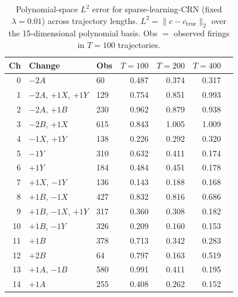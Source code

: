 \begin{table}[htbp]
\centering
\caption{%
  Polynomial-space $L^2$ error for sparse-learning-CRN (fixed $\lambda=0.01$)
  across trajectory lengths.
  $L^2 = \|\hat{{c}} - c_{{\mathrm{{true}}}}\|_2$ over the 15-dimensional
  polynomial basis. Obs $=$ observed firings in $T{=}100$ trajectories.
}
\label{tab:lasso-fixed-lambda}
\begin{tabular}{rllrrrr}
\toprule
\textbf{Ch} & \textbf{Change} & \textbf{Obs} & $T=100$ & $T=200$ & $T=400$ \\
\midrule
0 & $-2A$ & 60 & 0.487 & 0.374 & 0.317 \\
1 & $-2A$, $+1X$, $+1Y$ & 129 & 0.754 & 0.851 & 0.993 \\
2 & $-2A$, $+1B$ & 230 & 0.962 & 0.879 & 0.938 \\
3 & $-2B$, $+1X$ & 615 & 0.843 & 1.005 & 1.009 \\
4 & $-1X$, $+1Y$ & 138 & 0.226 & 0.292 & 0.320 \\
5 & $-1Y$ & 310 & 0.632 & 0.411 & 0.174 \\
6 & $+1Y$ & 184 & 0.484 & 0.451 & 0.178 \\
7 & $+1X$, $-1Y$ & 136 & 0.143 & 0.188 & 0.168 \\
8 & $+1B$, $-1X$ & 427 & 0.832 & 0.816 & 0.686 \\
9 & $+1B$, $-1X$, $+1Y$ & 317 & 0.360 & 0.308 & 0.182 \\
10 & $+1B$, $-1Y$ & 326 & 0.209 & 0.160 & 0.153 \\
11 & $+1B$ & 378 & 0.713 & 0.342 & 0.283 \\
12 & $+2B$ & 64 & 0.797 & 0.163 & 0.519 \\
13 & $+1A$, $-1B$ & 580 & 0.991 & 0.411 & 0.195 \\
14 & $+1A$ & 255 & 0.408 & 0.262 & 0.152 \\
\bottomrule
\end{tabular}
\end{table}